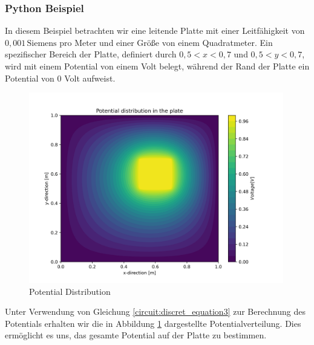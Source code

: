 \subsubsection{Python Beispiel}
In diesem Beispiel betrachten wir eine leitende Platte mit einer Leitfähigkeit von $0,001 \, \text{Siemens pro Meter}$ und einer Größe von einem Quadratmeter. Ein spezifischer Bereich der Platte, definiert durch $0,5 < x < 0,7$ und $0,5 < y < 0,7$, wird mit einem Potential von einem Volt belegt, während der Rand der Platte ein Potential von 0 Volt aufweist.
\begin{figure}[h]
	\centering
	\includegraphics[width=0.99\textwidth]{papers/circuit/potential_distribution.png}
	\caption{Potential Distribution}
	\label{fig:potential_distribution}
\end{figure}
Unter Verwendung von Gleichung \ref{circuit:discret_equation3} zur Berechnung des Potentials erhalten wir die in Abbildung \ref{fig:potential_distribution} dargestellte Potentialverteilung. Dies ermöglicht es uns, das gesamte Potential auf der Platte zu bestimmen.

